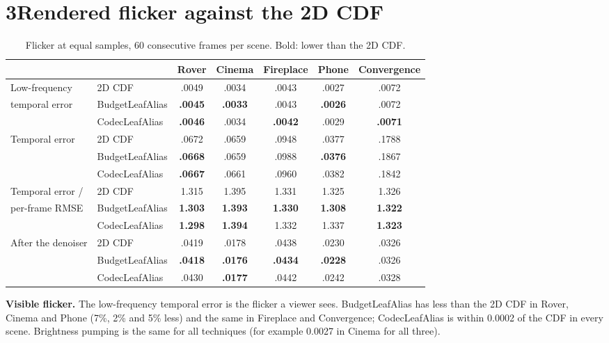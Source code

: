 \documentclass[10pt]{article}
\begin{document}
\section*{3\quad Rendered flicker against the 2D CDF}

\begin{table}[H]
\centering\small
\begin{tabular}{llccccc}
\toprule
& & Rover & Cinema & Fireplace & Phone & Convergence \\
\midrule
Low-frequency & 2D CDF & .0049 & .0034 & .0043 & .0027 & .0072 \\
temporal error & BudgetLeafAlias & \textbf{.0045} & \textbf{.0033} & .0043 & \textbf{.0026} & .0072 \\
& CodecLeafAlias & \textbf{.0046} & .0034 & \textbf{.0042} & .0029 & \textbf{.0071} \\
\midrule
Temporal error & 2D CDF & .0672 & .0659 & .0948 & .0377 & .1788 \\
& BudgetLeafAlias & \textbf{.0668} & .0659 & .0988 & \textbf{.0376} & .1867 \\
& CodecLeafAlias & \textbf{.0667} & .0661 & .0960 & .0382 & .1842 \\
\midrule
Temporal error / & 2D CDF & 1.315 & 1.395 & 1.331 & 1.325 & 1.326 \\
per-frame RMSE & BudgetLeafAlias & \textbf{1.303} & \textbf{1.393} & \textbf{1.330} & \textbf{1.308} & \textbf{1.322} \\
& CodecLeafAlias & \textbf{1.298} & \textbf{1.394} & 1.332 & 1.337 & \textbf{1.323} \\
\midrule
After the denoiser & 2D CDF & .0419 & .0178 & .0438 & .0230 & .0326 \\
& BudgetLeafAlias & \textbf{.0418} & \textbf{.0176} & \textbf{.0434} & \textbf{.0228} & .0326 \\
& CodecLeafAlias & .0430 & \textbf{.0177} & .0442 & .0242 & .0328 \\
\bottomrule
\end{tabular}
\caption{Flicker at equal samples, 60 consecutive frames per scene. Bold: lower than the 2D CDF.}
\label{tab:flicker}
\end{table}

\textbf{Visible flicker.} The low-frequency temporal error is the flicker a viewer sees. BudgetLeafAlias has less than the 2D CDF in Rover, Cinema and Phone (7\%, 2\% and 5\% less) and the same in Fireplace and Convergence; CodecLeafAlias is within 0.0002 of the CDF in every scene. Brightness pumping is the same for all techniques (for example 0.0027 in Cinema for all three).
\end{document}
